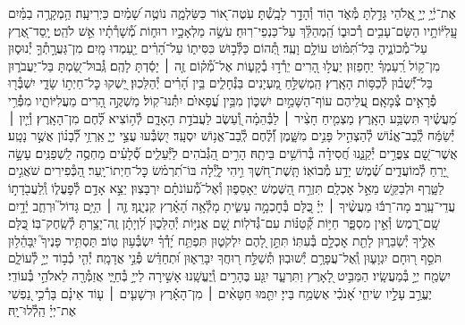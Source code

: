 \documentclass[twoside, openany, parskip=half, 11pt]{book}
\begin{document}
\newcommand{\RChBarekhi}{
\instruction{:בראש חודש}
\firstword{בָּרְ֯כִ֥י נַפְשִׁ֗י } \source{תהלים קד}
אֶת־יְ֫יָ֥ יְיָ֣ אֱ֭לֹהַי גָּדַ֣לְתָּ מְּ֯אֹ֑ד ה֖וֹד וְ֯הָדָ֣ר לָבָֽשְׁ֯תָּ׃
עֹֽטֶה־א֭וֹר כַּשַּׂלְמָ֑ה נוֹטֶ֥ה שָׁ֝מַ֗יִם כַּיְרִיעָֽה׃
הַ֥מְקָרֶ֥ה בַמַּ֗יִם עֲֽלִיּ֫וֹתָ֥יו הַשָּׂם־עָבִ֥ים רְ֯כוּב֑וֹ הַֽ֝מְהַלֵּ֗ךְ עַל־כַּנְפֵי־רֽוּחַ׃
עֹשֶׂ֣ה מַלְאָכָ֣יו רוּח֑וֹת מְ֯֝שָׁרְ֯תָ֗יו אֵ֣שׁ לֹהֵֽט׃
יָֽסַד־אֶ֭רֶץ עַל־מְ֯כוֹנֶ֑יהָ בַּל־תִּ֝מּ֗וֹט עוֹלָ֥ם וָעֶֽד׃
תְּ֭֯הוֹם כַּלְּ֯ב֣וּשׁ כִּסִּית֑וֹ עַל־הָ֝רִ֗ים יַ֖עַמְדוּ מָֽיִם׃
מִן־גַּעֲרָ֣תְ֯ךָ֣ יְ֯נוּס֑וּן מִן־ק֥וֹל רַֽ֝עַמְךָ֗ יֵחָפֵזֽוּן׃
יַעֲל֣וּ הָ֭רִים יֵרְ֯ד֣וּ בְ֯קָע֑וֹת אֶל־מְ֯֝ק֗וֹם זֶ֤ה ׀ יָסַ֬דְתָּ לָהֶֽם׃
גְּֽ֯בוּל־שַׂ֭מְתָּ בַּל־יַעֲבֹר֑וּן בַּל־יְ֯֝שֻׁב֗וּן לְ֯כַסּ֥וֹת הָאָֽרֶץ׃
הַֽמְשַׁלֵּ֣חַ מַ֭עְיָנִים בַּנְּ֯חָלִ֑ים בֵּ֥ין הָ֝רִ֗ים יְ֯הַלֵּכֽוּן׃
יַ֭שְׁקוּ כׇּל־חַיְת֣וֹ שָׂדָ֑י יִשְׁבְּ֯ר֖וּ פְ֯רָאִ֣ים צְ֯מָאָֽם׃
עֲ֭לֵיהֶם עוֹף־הַשָּׁמַ֣יִם יִשְׁכּ֑וֹן מִבֵּ֥ין עֳ֝פָאיִ֗ם יִתְּ֯נוּ־קֽוֹל׃
מַשְׁקֶ֣ה הָ֭רִים מֵעֲלִיּוֹתָ֑יו מִפְּ֯רִ֥י מַ֝עֲשֶׂ֗יךָ תִּשְׂבַּ֥ע הָאָֽרֶץ׃
מַצְמִ֤יחַ חָצִ֨יר ׀ לַבְּ֯הֵמָ֗ה וְ֭֯עֵשֶׂב לַעֲבֹדַ֣ת הָאָדָ֑ם לְ֯ה֥וֹצִיא לֶ֗֝חֶם מִן־הָאָֽרֶץ׃
וְ֯יַ֤יִן ׀ יְ֯שַׂמַּ֬ח לְֽ֯בַב־אֱנ֗וֹשׁ לְ֯הַצְהִ֣יל פָּנִ֣ים מִשָּׁ֑מֶן וְ֯֝לֶ֗חֶם לְֽ֯בַב־אֱנ֥וֹשׁ יִסְעָֽד׃
יִ֭שְׂבְּ֯עוּ עֲצֵ֣י יְיָ֑ אַֽרְזֵ֥י לְ֯֝בָנ֗וֹן אֲשֶׁ֣ר נָטָֽע׃
אֲשֶׁר־שָׁ֭ם צִפֳּרִ֣ים יְ֯קַנֵּ֑נוּ חֲ֝סִידָ֗ה בְּ֯רוֹשִׁ֥ים בֵּיתָֽהּ׃
הָרִ֣ים הַ֭גְּ֯בֹהִים לַיְּ֯עֵלִ֑ים סְ֯֝לָעִ֗ים מַחְסֶ֥ה לַֽשְׁפַנִּֽים׃
עָשָׂ֣ה יָ֭רֵחַ לְ֯מוֹעֲדִ֑ים שֶׁ֝֗מֶשׁ יָדַ֥ע מְ֯בוֹאֽוֹ׃
תָּֽשֶׁת־חֹ֭שֶׁךְ וִ֣יהִי לָ֑יְ֯לָה בּוֹ־תִ֝רְמֹ֗שׂ כׇּל־חַיְתוֹ־יָֽעַר׃
הַ֭כְּ֯פִירִים שֹׁאֲגִ֣ים לַטָּ֑רֶף וּלְבַקֵּ֖שׁ מֵאֵ֣ל אׇכְלָֽם׃
תִּזְרַ֣ח הַ֭שֶּׁמֶשׁ יֵאָסֵפ֑וּן וְ֯אֶל־מְ֯֝עוֹנֹתָ֗ם יִרְבָּצֽוּן׃
יֵצֵ֣א אָדָ֣ם לְ֯פׇעֳל֑וֹ וְֽ֯לַעֲבֹ֖דָת֣וֹ עֲדֵי־עָֽרֶב׃
מָה־רַבּ֬וּ מַעֲשֶׂ֨יךָ ׀ יְיָ֗ כֻּ֭לָּם בְּ֯חׇכְמָ֣ה עָשִׂ֑יתָ מָלְ֯אָ֥ה הָ֝אָ֗רֶץ קִנְיָנֶֽךָ׃
זֶ֤ה ׀ הַיָּ֥ם גָּדוֹל֮ וּרְחַ֢ב יָ֫דָ֥יִם שָֽׁם־רֶ֭מֶשׂ וְ֯אֵ֣ין מִסְפָּ֑ר חַיּ֥וֹת קְ֯֝טַנּ֗וֹת עִם־גְּ֯דֹלֽוֹת׃
שָׁ֭ם אֳנִיּ֣וֹת יְ֯הַלֵּכ֑וּן לִ֝וְיָתָ֗ן זֶֽה־יָצַ֥רְתָּ לְ֯שַֽׂחֶק־בּֽוֹ׃
כֻּ֭לָּם אֵלֶ֣יךָ יְ֯שַׂבֵּר֑וּן לָתֵ֖ת אׇכְלָ֣ם בְּ֯עִתּֽוֹ׃
תִּתֵּ֣ן לָ֭הֶם יִלְקֹט֑וּן תִּפְתַּ֥ח יָ֝דְ֯ךָ֗ יִשְׂבְּ֯ע֥וּן טֽוֹב׃
תַּסְתִּ֥יר פָּנֶיךָ֮ יִֽבָּהֵ֫ל֥וּן תֹּסֵ֣ף ר֭וּחָם יִגְוָע֑וּן וְֽ֯אֶל־עֲפָרָ֥ם יְ֯שׁוּבֽוּן׃
תְּ֯שַׁלַּ֣ח ר֭וּחֲךָ יִבָּרֵא֑וּן וּ֝תְחַדֵּ֗שׁ פְּ֯נֵ֣י אֲדָמָֽה׃
יְ֯הִ֤י כְ֯ב֣וֹד יְיָ֣ לְ֯עוֹלָ֑ם יִשְׂמַ֖ח יְיָ֣ בְּ֯מַעֲשָֽׂיו׃
הַמַּבִּ֣יט לָ֭אָרֶץ וַתִּרְעָ֑ד יִגַּ֖ע בֶּהָרִ֣ים וְֽ֯יֶעֱשָֽׁנוּ׃
אָשִׁ֣ירָה לַייָ֣ בְּ֯חַיָּ֑י אֲזַמְּ֯רָ֖ה לֵאלֹהַ֣י בְּ֯עוֹדִֽי׃
יֶעֱרַ֣ב עָלָ֣יו שִׂיחִ֑י אָ֝נֹכִ֗י אֶשְׂמַ֥ח בַּייָ׃
יִתַּ֤מּוּ חַטָּאִ֨ים ׀ מִן־הָאָ֡רֶץ וּרְשָׁעִ֤ים ׀ ע֤וֹד אֵינָ֗ם בָּרְ֯כִ֣י נַ֭פְשִׁי אֶת־יְיָ֗ הַֽלְ֯לוּ־יָֽהּ׃
}
\RChBarekhi
\end{document}
